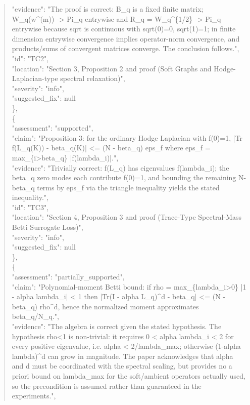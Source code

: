 \documentclass[11pt]{article}
\begin{document}
\begin{quote}
      "evidence": "The proof is correct: B\_q is a fixed finite matrix; W\_q(w\^{}(m)) -> Pi\_q entrywise and R\_q = W\_q\^{}\{1/2\} -> Pi\_q entrywise because sqrt is continuous with sqrt(0)=0, sqrt(1)=1; in finite dimension entrywise convergence implies operator-norm convergence, and products/sums of convergent matrices converge. The conclusion follows.",\\
      "id": "TC2",\\
      "location": "Section 3, Proposition 2 and proof (Soft Graphs and Hodge-Laplacian-type spectral relaxation)",\\
      "severity": "info",\\
      "suggested\_fix": null\\
    \},\\
    \{\\
      "assessment": "supported",\\
      "claim": "Proposition 3: for the ordinary Hodge Laplacian with f(0)=1, |Tr f(L\_q(K)) - beta\_q(K)| <= (N - beta\_q) eps\_f where eps\_f = max\_\{i>beta\_q\} |f(lambda\_i)|.",\\
      "evidence": "Trivially correct: f(L\_q) has eigenvalues f(lambda\_i); the beta\_q zero modes each contribute f(0)=1, and bounding the remaining N-beta\_q terms by eps\_f via the triangle inequality yields the stated inequality.",\\
      "id": "TC3",\\
      "location": "Section 4, Proposition 3 and proof (Trace-Type Spectral-Mass Betti Surrogate Loss)",\\
      "severity": "info",\\
      "suggested\_fix": null\\
    \},\\
    \{\\
      "assessment": "partially\_supported",\\
      "claim": "Polynomial-moment Betti bound: if rho = max\_\{lambda\_i>0\} |1 - alpha lambda\_i| < 1 then |Tr(I - alpha L\_q)\^{}d - beta\_q| <= (N - beta\_q) rho\^{}d, hence the normalized moment approximates beta\_q/N\_q.",\\
      "evidence": "The algebra is correct given the stated hypothesis. The hypothesis rho<1 is non-trivial: it requires 0 < alpha lambda\_i < 2 for every positive eigenvalue, i.e. alpha < 2/lambda\_max; otherwise (1-alpha lambda)\^{}d can grow in magnitude. The paper acknowledges that alpha and d must be coordinated with the spectral scaling, but provides no a priori bound on lambda\_max for the soft/ambient operators actually used, so the precondition is assumed rather than guaranteed in the experiments.",\\

\end{quote}
\end{document}
